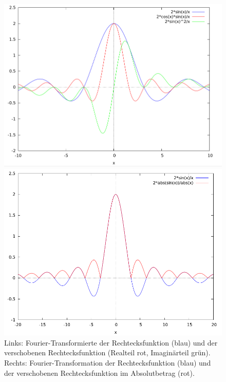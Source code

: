 \begin{remark}
\begin{description}
\begin{figure}[ht]
      \label{fig:Rechteck12}
    \end{figure}
    \begin{figure}[ht]
      \centering
      \begin{minipage}{0.49\linewidth}
        \centering
        \includegraphics[width=\linewidth]{Bilder/Rechteck3}
      \end{minipage}
      \begin{minipage}{0.49\linewidth}
        \centering
        \includegraphics[width=\linewidth]{Bilder/Rechteck4}
      \end{minipage}
      \caption{Links: Fourier-Transformierte der Rechtecksfunktion (blau) und der verschobenen
        Rechtecksfunktion (Realteil rot, Imaginärteil grün). Rechts: Fourier-Transformation der
        Rechtecksfunktion (blau) und der verschobenen Rechtecksfunktion im Absolutbetrag (rot).}
      \label{fig:Rechteck34}
    \end{figure}
		

\end{description}
\end{remark}
